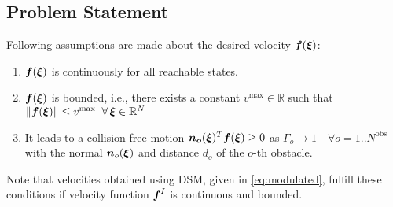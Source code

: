 \subsection{Problem Statement}
Following assumptions are made about the desired velocity $\boldsymbol{f}(\boldsymbol{\xi})$:
\begin{enumerate}
    \item $\boldsymbol{f}(\boldsymbol{\xi})$ is continuously  for all reachable states.
    \item $\boldsymbol{f}(\boldsymbol{\xi})$ is bounded, i.e., there exists a constant $v^{\mathrm{max}} \in \mathbb{R}$ such that $\| \boldsymbol{f}(\boldsymbol{\xi}) \| \leq v^{\mathrm{max}} \;\; \forall \, \boldsymbol{\xi} \in \mathbb{R}^N$
    \item It leads to a collision-free motion $\boldsymbol{n_o}(\boldsymbol{\xi})^T \boldsymbol{f}(\boldsymbol{\xi}) \geq 0$ as $\Gamma_o \rightarrow 1 
  \quad \forall o = 1 .. N^{\mathrm{obs}}$
  with the normal $\boldsymbol{n}_o (\boldsymbol{\xi})$ and distance $d_o$ of the $o$-th obstacle. 
\end{enumerate}

Note that velocities obtained using DSM, given in \eqref{eq:modulated}, fulfill these conditions if velocity function $\boldsymbol{f}^I$ is continuous and bounded.
